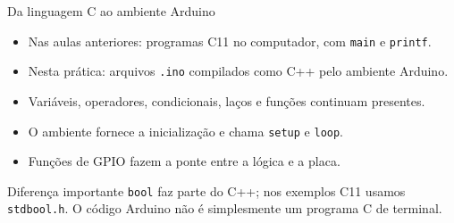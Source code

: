 \begin{frame}[t]{Da linguagem C ao ambiente Arduino}
\begin{itemize}
\item Nas aulas anteriores: programas C11 no computador, com \texttt{main} e \texttt{printf}.
\item Nesta prática: arquivos \texttt{.ino} compilados como C++ pelo ambiente Arduino.
\item Variáveis, operadores, condicionais, laços e funções continuam presentes.
\item O ambiente fornece a inicialização e chama \texttt{setup} e \texttt{loop}.
\item Funções de GPIO fazem a ponte entre a lógica e a placa.
\end{itemize}
\begin{block}{Diferença importante}
\texttt{bool} faz parte do C++; nos exemplos C11 usamos \texttt{stdbool.h}. O código Arduino não é simplesmente um programa C de terminal.
\end{block}
\end{frame}
